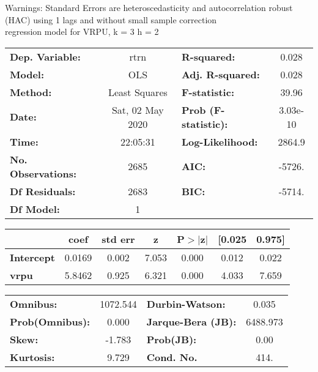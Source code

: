 Warnings: \newline
 [1] Standard Errors are heteroscedasticity and autocorrelation robust (HAC) using 1 lags and without small sample correction\\ 

regression model for VRPU, k = 3 h = 2\begin{center}
\begin{tabular}{lclc}
\toprule
\textbf{Dep. Variable:}    &       rtrn       & \textbf{  R-squared:         } &     0.028   \\
\textbf{Model:}            &       OLS        & \textbf{  Adj. R-squared:    } &     0.028   \\
\textbf{Method:}           &  Least Squares   & \textbf{  F-statistic:       } &     39.96   \\
\textbf{Date:}             & Sat, 02 May 2020 & \textbf{  Prob (F-statistic):} &  3.03e-10   \\
\textbf{Time:}             &     22:05:31     & \textbf{  Log-Likelihood:    } &    2864.9   \\
\textbf{No. Observations:} &        2685      & \textbf{  AIC:               } &    -5726.   \\
\textbf{Df Residuals:}     &        2683      & \textbf{  BIC:               } &    -5714.   \\
\textbf{Df Model:}         &           1      & \textbf{                     } &             \\
\bottomrule
\end{tabular}
\begin{tabular}{lcccccc}
                   & \textbf{coef} & \textbf{std err} & \textbf{z} & \textbf{P$> |$z$|$} & \textbf{[0.025} & \textbf{0.975]}  \\
\midrule
\textbf{Intercept} &       0.0169  &        0.002     &     7.053  &         0.000        &        0.012    &        0.022     \\
\textbf{vrpu}      &       5.8462  &        0.925     &     6.321  &         0.000        &        4.033    &        7.659     \\
\bottomrule
\end{tabular}
\begin{tabular}{lclc}
\textbf{Omnibus:}       & 1072.544 & \textbf{  Durbin-Watson:     } &    0.035  \\
\textbf{Prob(Omnibus):} &   0.000  & \textbf{  Jarque-Bera (JB):  } & 6488.973  \\
\textbf{Skew:}          &  -1.783  & \textbf{  Prob(JB):          } &     0.00  \\
\textbf{Kurtosis:}      &   9.729  & \textbf{  Cond. No.          } &     414.  \\
\bottomrule
\end{tabular}
\end{center}

